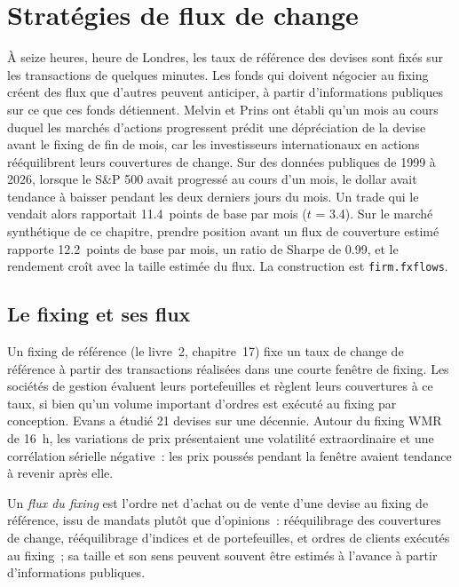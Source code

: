 \chapter{Stratégies de flux de change}\label{ch:s2:fx-flow-strategies}

À seize heures, heure de Londres, les taux de référence des devises sont fixés sur les transactions de quelques minutes. Les fonds qui doivent négocier au fixing
créent des flux que d'autres peuvent anticiper, à partir d'informations publiques sur ce que ces fonds détiennent. Melvin et Prins ont établi qu'un mois au cours duquel les marchés d'actions
progressent prédit une dépréciation de la devise avant le fixing de fin de mois, car les investisseurs internationaux en actions rééquilibrent leurs couvertures de change. Sur des données publiques
de 1999 à 2026, lorsque le S\&P 500 avait progressé au cours d'un mois, le dollar avait tendance à baisser pendant les deux derniers jours du mois. Un trade qui le vendait alors
rapportait 11.4~points de base par mois ($t$ = 3.4). Sur le marché synthétique de ce chapitre, prendre position avant un flux de couverture estimé rapporte 12.2~points de base par
mois, un ratio de Sharpe de 0.99, et le rendement croît avec la taille estimée du flux. La construction est \texttt{firm.fxflows}.

\section{Le fixing et ses flux}

Un fixing de référence (le livre~2, chapitre~17) fixe un taux de change de référence à partir des transactions réalisées dans une courte fenêtre de fixing. Les sociétés de gestion évaluent leurs portefeuilles et règlent
leurs couvertures à ce taux, si bien qu'un volume important d'ordres est exécuté au fixing par conception. Evans a étudié 21 devises sur une décennie. Autour du fixing WMR de 16~h,
les variations de prix présentaient une volatilité extraordinaire et une corrélation sérielle négative~: les prix poussés pendant la fenêtre avaient tendance à revenir après elle.

\begin{definition}\label{def:s2:fx-flow-strategies:flow}
Un \emph{flux du fixing} est l'ordre net d'achat ou de vente d'une devise au fixing de référence, issu de mandats plutôt que d'opinions~: rééquilibrage des couvertures de change,
rééquilibrage d'indices et de portefeuilles, et ordres de clients exécutés au fixing~; sa taille et son sens peuvent souvent être estimés à l'avance à partir
d'informations publiques.
\end{definition}

